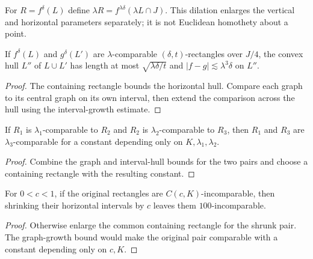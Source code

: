 \begin{definition}
\label{def:rectangle-dilation}
For $R=f^\delta(L)$ define
$\lambda R=f^{\lambda\delta}(\lambda L\cap J)$.
This dilation enlarges the vertical and horizontal parameters
separately; it is not Euclidean homothety about a point.
\end{definition}

\begin{lemma}
\label{lem:comparable-rectangles}
If $f^\delta(L)$ and $g^\delta(L')$ are
$\lambda$-comparable $(\delta,t)$-rectangles over $J/4$,
the convex hull $L''$ of $L\cup L'$ has length at most
$\sqrt{\lambda\delta/t}$ and
$|f-g|\lesssim\lambda^3\delta$ on $L''$.
\end{lemma}
\begin{proof}
The containing rectangle bounds the horizontal hull. Compare
each graph to its central graph on its own interval, then
extend the comparison across the hull using the interval-growth
estimate.
\end{proof}

\begin{corollary}
\label{cor:rectangle-transitivity}
If $R_1$ is $\lambda_1$-comparable to $R_2$ and $R_2$
is $\lambda_2$-comparable to $R_3$, then $R_1$ and $R_3$
are $\lambda_3$-comparable for a constant depending only
on $K,\lambda_1,\lambda_2$.
\end{corollary}
\begin{proof}
Combine the graph and interval-hull bounds for the two pairs
and choose a containing rectangle with the resulting constant.
\end{proof}

\begin{lemma}
\label{lem:rectangle-shrink}
For $0<c<1$, if the original rectangles are
$C(c,K)$-incomparable, then shrinking their horizontal
intervals by $c$ leaves them $100$-incomparable.
\end{lemma}
\begin{proof}
Otherwise enlarge the common containing rectangle for the
shrunk pair. The graph-growth bound would make the original
pair comparable with a constant depending only on $c,K$.
\end{proof}

